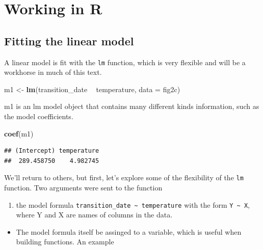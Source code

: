 \documentclass[]{book}
\newenvironment{Shaded}{\begin{snugshade}}{\end{snugshade}}
\newcommand{\DataTypeTok}[1]{\textcolor[rgb]{0.13,0.29,0.53}{#1}}
\newcommand{\KeywordTok}[1]{\textcolor[rgb]{0.13,0.29,0.53}{\textbf{#1}}}
\newcommand{\NormalTok}[1]{#1}
\newcommand{\OperatorTok}[1]{\textcolor[rgb]{0.81,0.36,0.00}{\textbf{#1}}}
\newcommand{\StringTok}[1]{\textcolor[rgb]{0.31,0.60,0.02}{#1}}
\providecommand{\tightlist}{%
  \setlength{\itemsep}{0pt}\setlength{\parskip}{0pt}}
\begin{document}
\hypertarget{working-in-r-1}{%
\section{Working in R}\label{working-in-r-1}}

\hypertarget{fitting-the-linear-model}{%
\subsection{Fitting the linear model}\label{fitting-the-linear-model}}

A linear model is fit with the \texttt{lm} function, which is very flexible and will be a workhorse in much of this text.

\begin{Shaded}
\begin{Highlighting}[]
\NormalTok{m1 <-}\StringTok{ }\KeywordTok{lm}\NormalTok{(transition_date }\OperatorTok{~}\StringTok{ }\NormalTok{temperature, }\DataTypeTok{data =}\NormalTok{ fig2c)}
\end{Highlighting}
\end{Shaded}

m1 is an lm model object that contains many different kinds information, such as the model coefficients.

\begin{Shaded}
\begin{Highlighting}[]
\KeywordTok{coef}\NormalTok{(m1)}
\end{Highlighting}
\end{Shaded}

\begin{verbatim}
## (Intercept) temperature 
##  289.458750    4.982745
\end{verbatim}

We'll return to others, but first, let's explore some of the flexibility of the \texttt{lm} function. Two arguments were sent to the function

\begin{enumerate}
\def\labelenumi{\arabic{enumi}.}
\tightlist
\item
  the model formula \texttt{transition\_date\ \textasciitilde{}\ temperature} with the form \texttt{Y\ \textasciitilde{}\ X}, where Y and X are names of columns in the data.
\end{enumerate}

\begin{itemize}
\tightlist
\item
  The model formula itself be assinged to a variable, which is useful when building functions. An example
\end{itemize}
\end{document}
